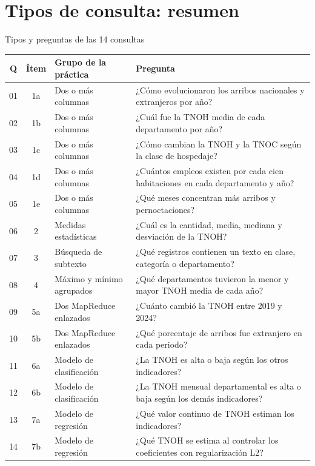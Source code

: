\documentclass{beamer}
\begin{document}
\section{Tipos de consulta: resumen}

\begin{frame}{Tipos y preguntas de las 14 consultas}
\tiny
\setlength{\tabcolsep}{3pt}
\renewcommand{\arraystretch}{1.08}
\begin{tabularx}{\textwidth}{c c p{} X}
\toprule
\textbf{Q} & \textbf{Ítem} & \textbf{Grupo de la práctica} & \textbf{Pregunta} \\
\midrule
01 & 1a & Dos o más columnas & ¿Cómo evolucionaron los arribos nacionales y extranjeros por año? \\
02 & 1b & Dos o más columnas & ¿Cuál fue la TNOH media de cada departamento por año? \\
03 & 1c & Dos o más columnas & ¿Cómo cambian la TNOH y la TNOC según la clase de hospedaje? \\
04 & 1d & Dos o más columnas & ¿Cuántos empleos existen por cada cien habitaciones en cada departamento y año? \\
05 & 1e & Dos o más columnas & ¿Qué meses concentran más arribos y pernoctaciones? \\
06 & 2 & Medidas estadísticas & ¿Cuál es la cantidad, media, mediana y desviación de la TNOH? \\
07 & 3 & Búsqueda de subtexto & ¿Qué registros contienen un texto en clase, categoría o departamento? \\
08 & 4 & Máximo y mínimo agrupados & ¿Qué departamentos tuvieron la menor y mayor TNOH media de cada año? \\
09 & 5a & Dos MapReduce enlazados & ¿Cuánto cambió la TNOH entre 2019 y 2024? \\
10 & 5b & Dos MapReduce enlazados & ¿Qué porcentaje de arribos fue extranjero en cada periodo? \\
11 & 6a & Modelo de clasificación & ¿La TNOH es alta o baja según los otros indicadores? \\
12 & 6b & Modelo de clasificación & ¿La TNOH mensual departamental es alta o baja según los demás indicadores? \\
13 & 7a & Modelo de regresión & ¿Qué valor continuo de TNOH estiman los indicadores? \\
14 & 7b & Modelo de regresión & ¿Qué TNOH se estima al controlar los coeficientes con regularización L2? \\
\bottomrule
\end{tabularx}
\end{frame}
\end{document}
